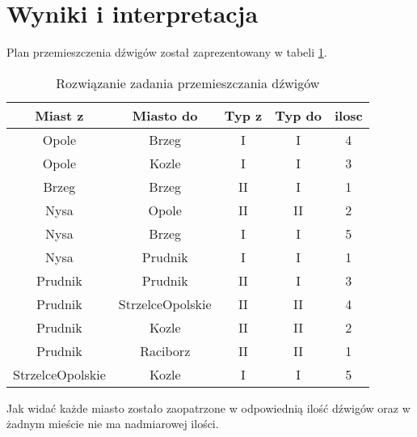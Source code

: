 \section{Wyniki i interpretacja}
Plan przemieszczenia dźwigów został zaprezentowany w tabeli \ref{tabela_zad2}. 
\begin{table}[ht]
    \begin{center}
        \begin{tabular}{| c | c | c | c | c |} 
            \hline
            \rowcolor{lgray}
            Miast z & Miasto do & Typ z & Typ do & ilosc  \\ [0.5ex] 
            \hline
            Opole & Brzeg & I & I & 4 \\
            \hline
            Opole & Kozle & I & I & 3 \\
            \hline
            Brzeg & Brzeg & II & I & 1 \\
            \hline
            Nysa & Opole & II & II & 2 \\
            \hline
            Nysa & Brzeg & I & I & 5 \\
            \hline
            Nysa & Prudnik & I & I & 1 \\
            \hline
            Prudnik & Prudnik & II & I & 3 \\
            \hline
            Prudnik & StrzelceOpolskie & II & II & 4 \\
            \hline
            Prudnik & Kozle & II & II & 2 \\
            \hline
            Prudnik & Raciborz & II & II & 1 \\
            \hline
            StrzelceOpolskie & Kozle & I & I & 5 \\
            \hline
        \end{tabular}
        \caption{Rozwiązanie zadania przemieszczania dźwigów}
        \label{tabela_zad2}
    \end{center}
\end{table}

Jak widać każde miasto zostało zaopatrzone w odpowiednią ilość dźwigów oraz w żadnym mieście nie ma nadmiarowej ilości.

